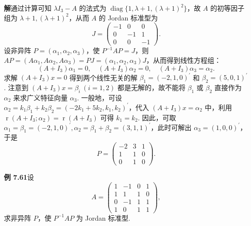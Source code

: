 \documentclass[UTF8,12pt,a4paper,fontset=fandol]{ctexart}
\begin{document}
\noindent\textbf{解}\quad 通过计算可知 $\lambda I_3-A$ 的法式为 $\operatorname{diag}\{1,\lambda+1,(\lambda+1)^2\}$，故 $A$ 的初等因子组为 $\lambda+1,(\lambda+1)^2$，从而 $A$ 的 Jordan 标准型为
\[
J=\left(\begin{array}{ccc}
-1&0&0\\
0&-1&1\\
0&0&-1
\end{array}\right).
\]
设非异阵 $P=(\alpha_1,\alpha_2,\alpha_3)$，使 $P^{-1}AP=J$，则 $AP=(A\alpha_1,A\alpha_2,A\alpha_3)=PJ=(\alpha_1,\alpha_2,\alpha_3)J$，从而得到线性方程组：
\[
(A+I_3)\alpha_1=0,\quad (A+I_3)\alpha_2=0,\quad (A+I_3)\alpha_3=\alpha_2.
\]
求解 $(A+I_3)x=0$ 得到两个线性无关的解 $\beta_1=(-2,1,0)^{\prime}$ 和 $\beta_2=(5,0,1)^{\prime}$. 注意到 $(A+I_3)x=\beta_i\ (i=1,2)$ 都是无解的，故不能将 $\beta_1$ 或 $\beta_2$ 直接作为 $\alpha_2$ 来求广义特征向量 $\alpha_3$. 一般地，可设 $\alpha_2=k_1\beta_1+k_2\beta_2=(-2k_1+5k_2,k_1,k_2)^{\prime}$，代入 $(A+I_3)x=\alpha_2$ 中，利用 $\operatorname{r}(A+I_3;\alpha_2)=\operatorname{r}(A+I_3)$ 可得 $k_1=k_2$. 因此，可取 $\alpha_1=\beta_1=(-2,1,0)^{\prime},\alpha_2=\beta_1+\beta_2=(3,1,1)^{\prime}$，此时可解出 $\alpha_3=(1,0,0)^{\prime}$，于是
\[
P=\left(\begin{array}{ccc}
-2&3&1\\
1&1&0\\
0&1&0
\end{array}\right).
\]

\noindent\textbf{例 7.61}\quad 设
\[
A=\left(\begin{array}{rrrr}
1&-1&0&1\\
1&1&1&0\\
0&-1&1&1\\
1&0&1&1
\end{array}\right),
\]
求非异阵 $P$，使 $P^{-1}AP$ 为 Jordan 标准型.
\end{document}
